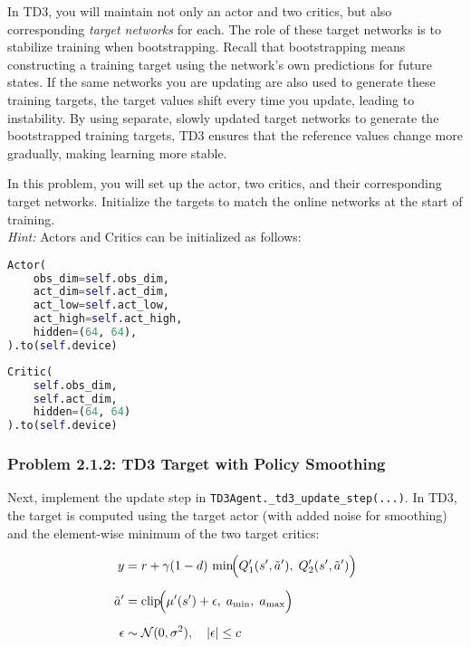 \documentclass[12pt]{article}
\begin{document}
In TD3, you will maintain not only an actor and two critics, but also corresponding \emph{target networks} for each. The role of these target networks is to stabilize training when bootstrapping. Recall that bootstrapping means constructing a training target using the network’s own predictions for future states. If the same networks you are updating are also used to generate these training targets, the target values shift every time you update, leading to instability. By using separate, slowly updated target networks to generate the bootstrapped training targets, TD3 ensures that the reference values change more gradually, making learning more stable.

In this problem, you will set up the actor, two critics, and their corresponding target networks. Initialize the targets to match the online networks at the start of training. \\
\textit{Hint:} Actors and Critics can be initialized as follows:

\begin{minipage}{0.45\linewidth}
\begin{lstlisting}[language=Python]
Actor(
    obs_dim=self.obs_dim,
    act_dim=self.act_dim,
    act_low=self.act_low,
    act_high=self.act_high,
    hidden=(64, 64),
).to(self.device)
\end{lstlisting}
\end{minipage}
\hfill
\begin{minipage}{0.45\linewidth}
\begin{lstlisting}[language=Python]
Critic(
    self.obs_dim,
    self.act_dim,
    hidden=(64, 64)
).to(self.device)
\end{lstlisting}
\end{minipage}

\subsubsection*{Problem 2.1.2: TD3 Target with Policy Smoothing}

Next, implement the update step in \texttt{TD3Agent.\_td3\_update\_step(...)}.  
In TD3, the target is computed using the target actor (with added noise for smoothing) and the element-wise minimum of the two target critics:  

\begin{equation}
\begin{aligned}
y &= r + \gamma (1-d)\,
      \min\!\Bigl( Q'_1(s', \tilde a'),\; Q'_2(s', \tilde a') \Bigr) \\[6pt]
\tilde a' &= \text{clip}\!\Bigl( \mu'(s') + \epsilon,\; a_{\min},\; a_{\max} \Bigr) \\[6pt]
\epsilon &\sim \mathcal{N}(0,\sigma^2), 
\quad |\epsilon| \le c
\end{aligned}
\end{equation}
\end{document}
